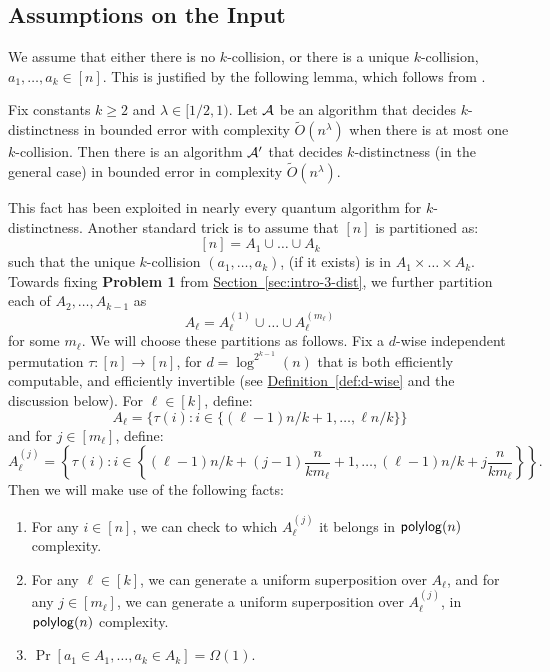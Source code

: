 \documentclass{theoretics}
\renewcommand{\sec}[1]{\hyperref[sec:#1]{Section~\ref*{sec:#1}}}
\newcommand{\defin}[1]{\hyperref[def:#1]{Definition~\ref*{def:#1}}}
\renewcommand{\>}{\rangle}
\newcommand{\<}{\langle}
\renewcommand{\(}{\left(}
\renewcommand{\)}{\right)}
\begin{document}
\subsection{Assumptions on the Input}\label{sec:k-dist-assumptions}
We assume that either there is no $k$-collision, or there is a unique $k$-collision, $a_1,\dots,a_k\in [n]$. This is justified by the following lemma, which follows from \cite[Section 5]{ambainis2004QWalkForElementDist}.
\begin{lemma}\label{lem:unique-to-multiple}
	Fix constants $k\geq 2$ and $\lambda\in[1/2,1)$. 
	Let ${\cal A}$ be an algorithm that decides $k$-distinctness in bounded error with complexity $\widetilde{O}(n^{\lambda})$ when there is at most one $k$-collision. Then there is an algorithm ${\cal A}'$ that decides $k$-distinctness (in the general case) in bounded error in complexity $\widetilde{O}(n^{\lambda})$.
\end{lemma}
This fact has been exploited in nearly every quantum algorithm for $k$-distinctness.
Another standard trick is to assume that $[n]$ is partitioned as:
$$[n]=A_1\cup \dots \cup A_k$$
such that the unique $k$-collision $(a_1,\dots,a_k)$, (if it exists) is in $A_1\times\dots\times A_k$. Towards fixing \textbf{Problem 1} from \sec{intro-3-dist}, we further partition each of $A_2,\dots,A_{k-1}$ as 
$$A_{\ell}=A_{\ell}^{(1)}\cup\dots\cup A_{\ell}^{(m_{\ell})}$$
for some $m_{\ell}$. We will choose these partitions as follows. Fix a $d$-wise independent permutation $\tau:[n]\rightarrow [n]$, for $d=\log^{2^{k-1}}(n)$ that is both efficiently computable, and efficiently invertible (see \defin{d-wise} and the discussion below).
For ${\ell}\in [k]$, define:
$$A_{\ell}=\{\tau(i):i\in \{(\ell-1)n/k+1,\dots,\ell n/k\}\}$$
and for $j\in [m_\ell]$, define:
\begin{equation}\label{eq:k-dist-partition}
A_{\ell}^{(j)}=\left\{\tau(i): i\in \left\{(\ell-1)n/k+(j-1)\frac{n}{km_{\ell}}+1,\dots,(\ell-1)n/k+ j\frac{n}{km_\ell}\right\}\right\}.
\end{equation}
\noindent Then we will make use of the following facts:
\begin{lemma}
	\begin{enumerate}
		\item For any $i\in [n]$, we can check to which $A_{\ell}^{(j)}$ it belongs in ${\sf polylog}(n)$ complexity.
		\item For any $\ell\in [k]$, we can generate a uniform superposition over $A_\ell$, and for any $j\in [m_\ell]$, we can generate a uniform superposition over $A_\ell^{(j)}$, in ${\sf polylog}(n)$ complexity.
		\item $\Pr[a_1\in A_1,\dots,a_k\in A_k]=\Omega(1)$. 
	\end{enumerate}
\end{lemma}
\end{document}
